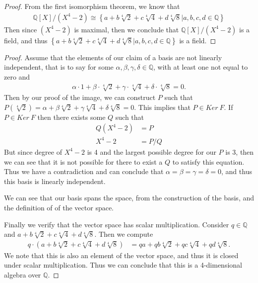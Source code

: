 \documentclass[10pt]{armath}
\newcommand{\Q}{\mathbb{Q}}
\newenvironment{claim}[1]{\par\noindent\textit{Claim:}\space#1}{}
\begin{document}
\begin{proof}
  From the first isomorphism theorem, we know that
  \begin{align*}
    \Q[X]/(X^4-2) \cong \left\{a+b\sqrt[4]{2}+c\sqrt[4]{4}+d\sqrt[4]{8}\vert
      a,b,c,d\in\Q\right\}
  \end{align*}
  Then since $(X^4-2)$ is maximal, then we conclude that $\Q[X]/(X^4-2)$ is a
  field, and thus $\left\{a+b\sqrt[4]{2}+c\sqrt[4]{4}+d\sqrt[4]{8}\vert
    a,b,c,d\in\Q\right\}$ is a field.
\end{proof}
\begin{proof}
  Assume that the elements of our claim of a basis are not linearly
  independent, that is to say for some $\alpha,\beta,\gamma,\delta\in\Q$, with
  at least one not equal to zero and
  \begin{align*}
    \alpha\cdot1+\beta\cdot\sqrt[4]{2}+\gamma\cdot\sqrt[4]{4}+\delta\cdot\sqrt[4]{8}=0.
  \end{align*}
  Then by our proof of the image, we can construct $P$ such that
  $P(\sqrt[4]{2})=\alpha+\beta\sqrt[4]{2}+\gamma\sqrt[4]{4}+\delta\sqrt[4]{8}=0$.
  This implies that $P\in Ker\ F$. If $P\in Ker\ F$ then there exists some $Q$
  such that
  \begin{align*}
    Q(X^4-2)&=P\\
    X^4-2&=P/Q
  \end{align*}
  But since degree of $X^4-2$ is 4 and the largest possible degree for our $P$
  is 3, then we can see that it is not possible for there to exist a $Q$ to
  satisfy this equation. Thus we have a contradiction and can conclude that
  $\alpha=\beta=\gamma=\delta=0$, and thus this basis is linearly independent.

  We can see that our basis spans the space, from the construction of the
  basis, and the definition of of the vector space.

  Finally we verify that the vector space has scalar multiplication. Consider
  $q\in\Q$ and $a+b\sqrt[4]{2}+c\sqrt[4]{4}+d\sqrt[4]{8}$. Then we compute
  \begin{align*}
     q\cdot\left(a+b\sqrt[4]{2}+c\sqrt[4]{4}+d\sqrt[4]{8}\right)&=
     qa+qb\sqrt[4]{2}+qc\sqrt[4]{4}+qd\sqrt[4]{8}.
  \end{align*}
  We note that this is also an element of the vector space, and thus it is
  closed under scalar multiplication. Thus we can conclude that this is a
  4-dimensional algebra over $\Q$.
\end{proof}
\end{document}
